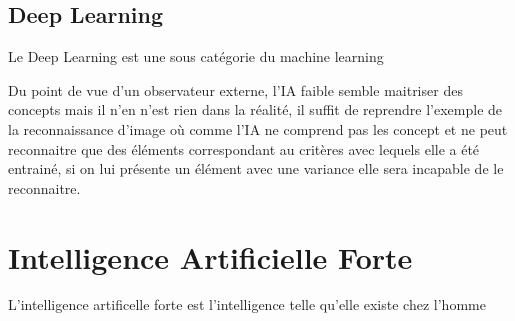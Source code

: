 \subsection{Deep Learning}
Le Deep Learning est une sous catégorie du machine learning

Du point de vue d'un observateur externe, l'IA faible
semble maitriser des concepts mais il n'en n'est rien dans la 
réalité, il suffit de reprendre l'exemple de la reconnaissance d'image
où comme l'IA ne comprend pas les concept et ne peut reconnaitre 
que des éléments correspondant au critères avec lequels elle a été 
entrainé, si on lui présente un élément avec une variance elle 
sera incapable de le reconnaitre. 
    
\section{Intelligence Artificielle Forte}
L'intelligence artificelle forte est l'intelligence
telle qu'elle existe chez l'homme





